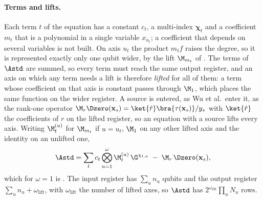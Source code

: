 \paragraph{Terms and lifts.} Each term $t$ of the equation has a constant $c_t$, a multi-index $\boldsymbol\chi_t$ and a coefficient $m_t$ that is a polynomial in a single variable $x_{u_t}$; a coefficient that depends on several variables is not built. On axis $u_t$ the product $m_tf$ raises the degree, so it is represented exactly only one qubit wider, by the lift $\M_{m_t}$ of . The terms of $\Astd$ are summed, so every term must reach the same output register, and an axis on which any term needs a lift is therefore \emph{lifted} for all of them: a term whose coefficient on that axis is constant passes through $\M_1$, which places the same function on the wider register. A source is entered, as Wu et al.\ enter it, as the rank-one operator $\M_r\Dzero(\mathbf x_s)=\ket{\hat r}\bra{\tau(\mathbf x_s)}/y_s$ with $\ket{\hat r}$ the coefficients of $r$ on the lifted register, so an equation with a source lifts every axis. Writing $\M^{(u)}_t$ for $\M_{m_t}$ if $u=u_t$, $\M_1$ on any other lifted axis and the identity on an unlifted one,
\begin{equation}
    \Astd = \sum_t c_t\bigotimes_{u=1}^{\omega}\M^{(u)}_t\,\G^{\chi_{t,u}} \;-\; \M_r\,\Dzero(\mathbf x_s),
    \label{eq:app-A-multi}
\end{equation}
which for $\omega=1$ is . The input register has $\sum_un_u$ qubits and the output register $\sum_un_u+\omega_{\mathrm{lift}}$, with $\omega_{\mathrm{lift}}$ the number of lifted axes, so $\Astd$ has $2^{\omega_{\mathrm{lift}}}\prod_uN_u$ rows.

